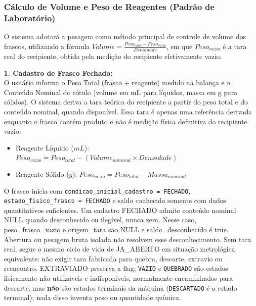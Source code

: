 \subsubsection{Cálculo de Volume e Peso de Reagentes (Padrão de Laboratório)}
\begin{regra}
O sistema adotará a pesagem como método principal de controle de volume dos frascos, utilizando a fórmula $Volume = \frac{Peso_{total} - Peso_{vazio}}{Densidade}$, em que $Peso_{vazio}$ é a tara real do recipiente, obtida pela medição do recipiente efetivamente vazio.

\textbf{1. Cadastro de Frasco Fechado:}\\
O usuário informa o Peso Total (frasco + reagente) medido na balança e o Conteúdo Nominal do rótulo (volume em mL para líquidos, massa em g para sólidos). O sistema deriva a tara teórica do recipiente a partir do peso total e do conteúdo nominal, quando disponível. Essa tara é apenas uma referência derivada enquanto o frasco contém produto e não é medição física definitiva do recipiente vazio:\\
\begin{itemize}
    \item Reagente Líquido ($mL$): $Peso_{vazio} = Peso_{total} - (Volume_{nominal} \times Densidade)$
    \item Reagente Sólido ($g$): $Peso_{vazio} = Peso_{total} - Massa_{nominal}$
\end{itemize}
O frasco inicia com \texttt{condicao\_inicial\_cadastro = FECHADO}, \texttt{estado\_fisico\_frasco = FECHADO} e saldo conhecido somente com dados quantitativos suficientes. Um cadastro FECHADO admite conteúdo nominal NULL quando desconhecido ou ilegível, nunca zero. Nesse caso, peso\_frasco\_vazio e origem\_tara são NULL e saldo\_desconhecido é true. Abertura ou pesagem bruta isolada não resolvem esse desconhecimento. Sem tara real, segue o mesmo ciclo de vida de JA\_ABERTO em situação metrológica equivalente: não exigir tara fabricada para quebra, descarte, extravio ou reencontro. EXTRAVIADO preserva a flag; \texttt{VAZIO} e \texttt{QUEBRADO} são estados fisicamente não utilizáveis e indisponíveis, normalmente encaminhados para descarte, mas \textbf{não} são estados terminais da máquina (\texttt{DESCARTADO} é o estado terminal); nada disso inventa peso ou quantidade química.


\end{regra}
